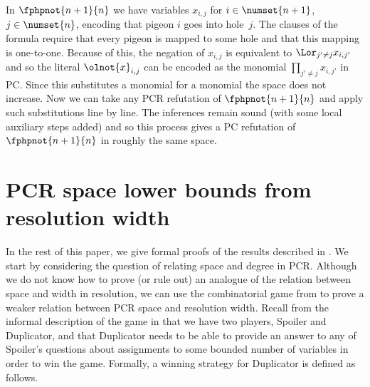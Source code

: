 \begin{ourproof}[sketch]
  In
%
  $\fphpnot{n+1}{n}$
  we have variables
  $x_{i,j}$
  for
%
  $i \in \numset{n+1}$,
  $j \in \numset{n}$,
%
  encoding that pigeon $i$ goes into hole~$j$. The clauses of the
  formula require that every pigeon is mapped to some hole and that
  this mapping is one-to-one.
  Because of this, the negation of
  $x_{i,j}$
  is equivalent to 
  $\Lor_{j'\neq j} x_{i,j'}$
  and so the literal
  $\olnot{x}_{i,j}$
  can be encoded as the monomial
  $\prod_{j'\not=j} x_{i,j'}$
  in PC.
  Since this substitutes a monomial for a monomial the space does not
  increase. 
  Now we can take any PCR refutation of
  $\fphpnot{n+1}{n}$
%
  and apply such substitutions line by line.
  The inferences remain sound (with some local auxiliary steps added)
  and so this process gives a PC refutation of
  $\fphpnot{n+1}{n}$ 
%
  in roughly the same space.
%
%
%
%
%
%
%
%
%
\end{ourproof}

 
%
\section{PCR space lower bounds from resolution width}%
%
\label{sec:substitution}

In the rest of this paper, 
we give formal proofs of the results described in
.
We start by considering  the question of relating space and degree
in PCR\@. Although we do not know how to prove (or rule out) an analogue
of the relation between space and width in resolution, 
we can use the combinatorial game from
\cite{AD08CombinatoricalCharacterization} 
to prove a weaker relation between PCR space and resolution width. Recall
from the informal description of the game in
 that we have two players, Spoiler and
Duplicator, and that Duplicator needs to be able to provide an
answer to any of Spoiler's questions about assignments to some
bounded number of variables in order to win the game. Formally, a
winning strategy for Duplicator is defined as follows.

